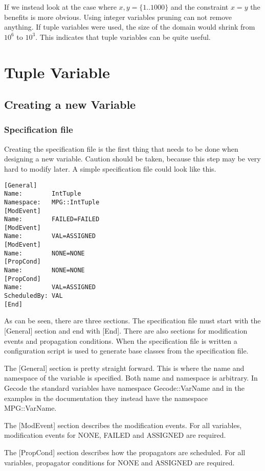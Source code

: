 \documentclass[a4paper,11pt]{article}
\begin{document}
If we instead look at the case where $x,y=\{1..1000\}$ and the constraint $x=y$ the benefits is more obvious. Using integer variables pruning can not remove anything. If tuple variables were used, the size of the domain would shrink from $10^6$ to $10^3$. This indicates that tuple variables can be quite useful.

\section{Tuple Variable}

\subsection{Creating a new Variable}
\subsubsection{Specification file}
Creating the specification file is the first thing that needs to be done when designing a new variable. Caution should be taken, because this step may be very hard to modify later. A simple specification file could look like this.

\begin{lstlisting}[frame=single]
[General]
Name:        IntTuple
Namespace:   MPG::IntTuple
[ModEvent]
Name:        FAILED=FAILED
[ModEvent]
Name:        VAL=ASSIGNED
[ModEvent]
Name:        NONE=NONE
[PropCond]
Name:        NONE=NONE
[PropCond]
Name:        VAL=ASSIGNED
ScheduledBy: VAL
[End]
\end{lstlisting}

As can be seen, there are three sections. The specification file must start with the [General] section and end with [End]. There are also sections for modification events and propagation conditions. When the specification file is written a configuration script is used to generate base classes from the specification file.

The [General] section is pretty straight forward. This is where the name and namespace of the variable is specified. Both name and namespace is arbitrary. In Gecode the standard variables have namespace Gecode::VarName and in the examples in the documentation they instead have the namespace MPG::VarName.

The [ModEvent] section describes the modification events. For all variables, modification events for NONE, FAILED and ASSIGNED are required.

The [PropCond] section describes how the propagators are scheduled. For all variables, propagator conditions for NONE and ASSIGNED are required.
\end{document}

